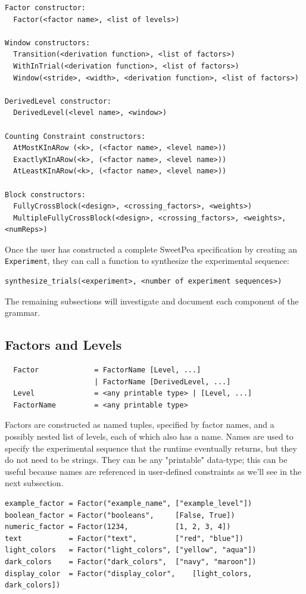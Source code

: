 \begin{verbatim}
Factor constructor:
  Factor(<factor name>, <list of levels>)

Window constructors:
  Transition(<derivation function>, <list of factors>)
  WithInTrial(<derivation function>, <list of factors>)
  Window(<stride>, <width>, <derivation function>, <list of factors>)

DerivedLevel constructor:
  DerivedLevel(<level name>, <window>)

Counting Constraint constructors:
  AtMostKInARow (<k>, (<factor name>, <level name>))
  ExactlyKInARow(<k>, (<factor name>, <level name>))
  AtLeastKInARow(<k>, (<factor name>, <level name>))

Block constructors:
  FullyCrossBlock(<design>, <crossing_factors>, <weights>)
  MultipleFullyCrossBlock(<design>, <crossing_factors>, <weights>, <numReps>)
\end{verbatim}

Once the user has constructed a complete SweetPea specification by creating an \texttt{Experiment}, they can call a function to synthesize the experimental sequence:

\begin{verbatim}
synthesize_trials(<experiment>, <number of experiment sequences>)
\end{verbatim}

The remaining subsections will investigate and document each component of the grammar.

\subsection{Factors and Levels}

\begin{verbatim}
  Factor             = FactorName [Level, ...]
                     | FactorName [DerivedLevel, ...]
  Level              = <any printable type> | [Level, ...]
  FactorName         = <any printable type>
\end{verbatim}

Factors are constructed as named tuples, specified by factor names, and a possibly nested list of levels, each of which also has a name. Names are used to specify the experimental sequence that the runtime eventually returns, but they do not need to be strings. They can be any "printable" data-type; this can be useful because names are referenced in user-defined constraints as we'll see in the next subsection.

\begin{verbatim}
example_factor = Factor("example_name", ["example_level"])
boolean_factor = Factor("booleans",     [False, True])
numeric_factor = Factor(1234,           [1, 2, 3, 4])
text           = Factor("text",         ["red", "blue"])
light_colors   = Factor("light_colors", ["yellow", "aqua"])
dark_colors    = Factor("dark_colors",  ["navy", "maroon"])
display_color  = Factor("display_color",    [light_colors, dark_colors])
\end{verbatim}


